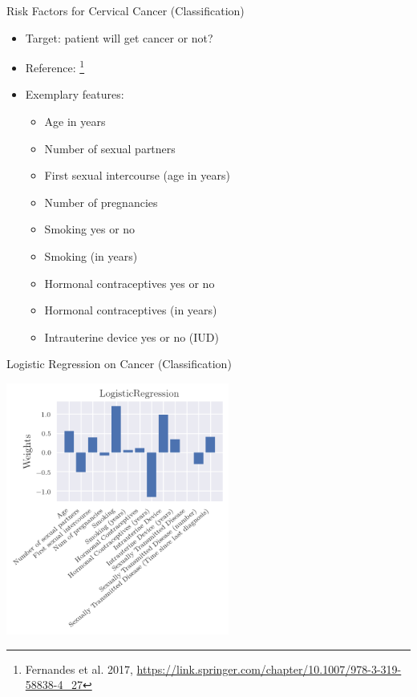 \documentclass[11pt,compress,t,notes=noshow, xcolor=table]{beamer}
\begin{document}
    \begin{vbframe}{Risk Factors for Cervical Cancer (Classification)}
        
        \begin{itemize}
            \item Target: patient will get cancer or not?
            \item Reference: \footnote{Fernandes et al. 2017, \url{https://link.springer.com/chapter/10.1007/978-3-319-58838-4_27}}
            \item Exemplary features:
            \begin{itemize}
                \item Age in years
                \item Number of sexual partners
                \item First sexual intercourse (age in years)
                \item Number of pregnancies
                \item Smoking yes or no
                \item Smoking (in years)
                \item Hormonal contraceptives yes or no
                \item Hormonal contraceptives (in years)
                \item Intrauterine device yes or no (IUD)
            \end{itemize}
        \end{itemize}
        
    \end{vbframe}
	
	\begin{vbframe}{Logistic Regression on  Cancer (Classification)}
        
        \centering
        \includegraphics[width=0.55\textwidth]{figure/lin_cancer.png}     
        
    \end{vbframe}
	
\end{document}
